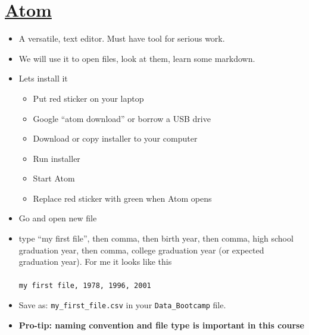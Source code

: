 \section*{\href{https://atom.io/}{Atom}}
\begin{itemize}
\item A versatile, text editor. Must have tool for serious work.
\item We will use it to open files, look at them, learn some markdown.
\item Lets install it
\begin{itemize}
\item Put red sticker on your laptop
\item Google ``atom download'' or borrow a USB drive
\item Download or copy installer to your computer
\item Run installer
\item Start Atom
\item Replace red sticker with green when Atom opens
\end{itemize}
\item Go and open new file
\item type ``my first file'', then comma, then birth year, then comma, high school graduation year, then comma, college graduation year (or expected graduation year). For me it looks like this\\
    \\
{\tt my first file, 1978, 1996, 2001} 
\item Save as: \verb|my_first_file.csv| in your \verb|Data_Bootcamp| file.
\item \textbf{Pro-tip: naming convention and file type is important in this course}
\end{itemize}



